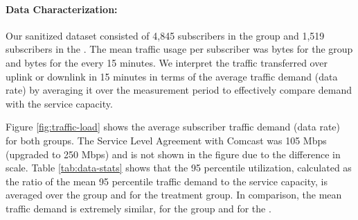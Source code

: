 

\paragraph{Data Characterization: }Our sanitized dataset consisted of 4,845 
subscribers in the \control{} group and 1,519 subscribers in the \treatment{}. 
The mean traffic usage per subscriber was  bytes for the \control{} 
group and  bytes for the \treatment{} every 15 minutes. We interpret 
the traffic transferred over uplink or downlink in 15 minutes in terms of the 
average traffic demand (data rate) by averaging it over the measurement period 
to effectively compare demand with the service capacity.

Figure \ref{fig:traffic-load} shows the average subscriber traffic demand 
(data rate) for both groups. The Service Level Agreement with Comcast was 105 
Mbps (upgraded to 250 Mbps) and is not shown in the figure due to the 
difference in scale. Table \ref{tab:data-stats} shows that the 95 percentile 
utilization, calculated as the ratio of the mean 95 
percentile traffic demand to the service capacity, is  averaged 
over the \control{} group and  for the treatment group. In 
comparison, the mean traffic demand is extremely similar,  for the 
\control{} group and  for the \treatment{}.